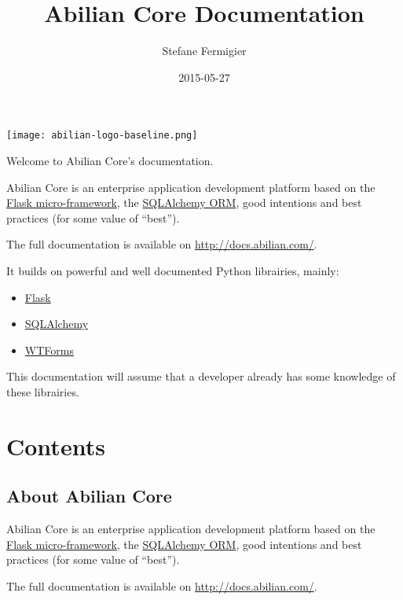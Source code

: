 \documentclass[a4paper,12pt,english]{sphinxmanual}
\title{Abilian Core Documentation}
\date{2015-05-27}
\author{Stefane Fermigier}
\begin{document}
\maketitle
\tableofcontents
{}\label{index::doc}


\texttt{[image: abilian-logo-baseline.png]}

Welcome to Abilian Core's documentation.

Abilian Core is an enterprise application development platform based on the \href{http://flask.pocoo.org/}{Flask micro-framework}, the \href{http://www.sqlalchemy.org/}{SQLAlchemy ORM}, good intentions and best practices (for some value of ``best'').

The full documentation is available on \href{http://docs.abilian.com/}{http://docs.abilian.com/}.

It builds on powerful and well documented Python librairies, mainly:
\begin{itemize}
\item {} 
\href{http://flask.pocoo.org/}{Flask}

\item {} 
\href{http://www.sqlalchemy.org/}{SQLAlchemy}

\item {} 
\href{http://wtforms.simplecodes.com/}{WTForms}

\end{itemize}

This documentation will assume that a developer already has some knowledge of
these librairies.


\part{Contents}
\label{index:contents}\label{index:welcome-to-the-abilian-core-documentation}

\chapter{About Abilian Core}
\label{introduction:about-abilian-core}\label{introduction::doc}
Abilian Core is an enterprise application development platform based on the \href{http://flask.pocoo.org/}{Flask micro-framework}, the \href{http://www.sqlalchemy.org/}{SQLAlchemy ORM}, good intentions and best practices (for some value of ``best'').

The full documentation is available on \href{http://docs.abilian.com/}{http://docs.abilian.com/}.
\end{document}

